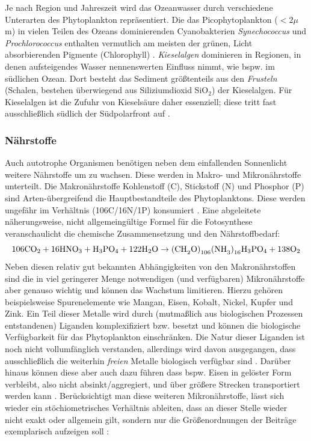 \documentclass[12pt,a4paper,onecolumn]{scrartcl}
\newcommand{\cotwo}{CO\textsubscript{2}}
\begin{document}
Je nach Region und Jahreszeit wird das Ozeanwasser durch verschiedene Unterarten des Phytoplankton repräsentiert. Die das Picophytoplankton ($<2\mu$m) in vielen Teilen des Ozeans dominierenden Cyanobakterien \textit{Synechococcus} und \textit{Prochlorococcus} enthalten vermutlich am meisten der grünen, Licht absorbierenden Pigmente (Chlorophyll) \citep{Emerson.2009}. \textit{Kieselalgen} dominieren in Regionen, in denen aufsteigendes Wasser nennenswerten Einfluss nimmt, wie bspw. im südlichen Ozean. Dort besteht das Sediment größtenteils aus den \textit{Frusteln} (Schalen, bestehen überwiegend aus Siliziumdioxid SiO$_2$) der Kieselalgen. Für Kieselalgen ist die Zufuhr von Kieselsäure daher essenziell; diese tritt fast ausschließlich südlich der Südpolarfront auf \citep{Falkowski.1998}.

\subsubsection{Nährstoffe} \label{sec:nährstoffe}
Auch autotrophe Organismen benötigen neben dem einfallenden Sonnenlicht weitere Nährstoffe um zu wachsen. Diese werden in Makro- und Mikronährstoffe unterteilt. Die Makronährstoffe Kohlenstoff (C), Stickstoff (N) und Phosphor (P) sind Arten-übergreifend die Hauptbestandteile des Phytoplanktons. Diese werden ungefähr im Verhältnis (106C/16N/1P) konsumiert \citep{Falkowski.1998}. Eine abgeleitete näherungsweise, nicht allgemeingültige Formel für die Fotosynthese  \citep{Emerson.2009} veranschaulicht die chemische Zusammensetzung und den Nährstoffbedarf:
\begin{equation}
\text{106\cotwo} + \text{16HNO}_3 + \text{H}_3\text{PO}_4 + \text{122H}_2\text{O} \rightarrow \text{(CH}_2\text{O)}_{106}\text{(NH}_3\text{)}_{16}\text{H}_3\text{PO}_4 + \text{138O}_2
\end{equation}
Neben diesen relativ gut bekannten Abhängigkeiten von den Makronährstoffen sind die in viel geringerer Menge notwendigen (und verfügbaren) Mikronährstoffe aber genauso wichtig und können das Wachstum limitieren. Hierzu gehören beispielsweise Spurenelemente wie Mangan, Eisen, Kobalt, Nickel, Kupfer und Zink. Ein Teil dieser Metalle wird durch (mutmaßlich aus biologischen Prozessen entstandenen) Liganden komplexifiziert bzw. besetzt und können die biologische Verfügbarkeit für das Phytoplankton einschränken. Die Natur dieser Liganden ist noch nicht vollumfänglich verstanden, allerdings wird davon ausgegangen, dass ausschließlich die weiterhin \textit{freien} Metalle biologisch verfügbar sind \citep{Emerson.2009}. Darüber hinaus können diese aber auch dazu führen dass bspw. Eisen in gelöster Form verbleibt, also nicht absinkt/aggregiert, und über größere Strecken transportiert werden kann \citep{Tagliabue.2017}. Berücksichtigt man diese weiteren Mikronährstoffe, lässt sich wieder ein stöchiometrisches Verhältnis ableiten, dass an dieser Stelle wieder nicht exakt oder allgemein gilt, sondern nur die Größenordnungen der Beiträge exemplarisch aufzeigen soll \citep{Emerson.2009}:
\end{document}
